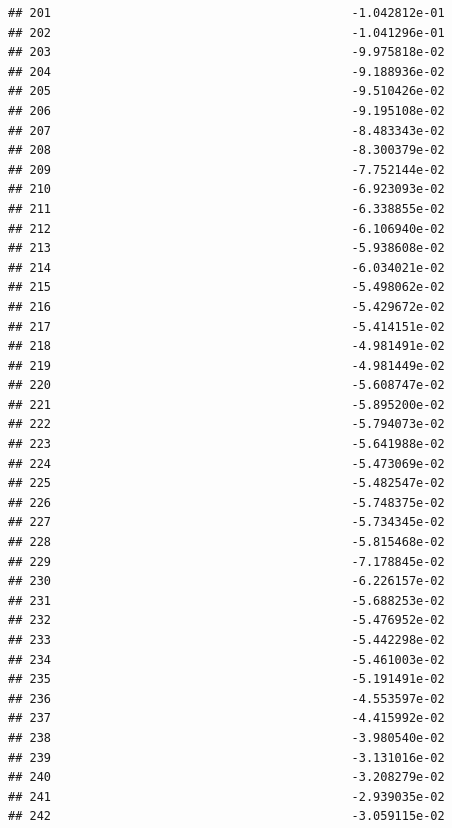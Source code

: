 \documentclass[
]{article}
\begin{document}
\begin{verbatim}
## 201                                          -1.042812e-01
## 202                                          -1.041296e-01
## 203                                          -9.975818e-02
## 204                                          -9.188936e-02
## 205                                          -9.510426e-02
## 206                                          -9.195108e-02
## 207                                          -8.483343e-02
## 208                                          -8.300379e-02
## 209                                          -7.752144e-02
## 210                                          -6.923093e-02
## 211                                          -6.338855e-02
## 212                                          -6.106940e-02
## 213                                          -5.938608e-02
## 214                                          -6.034021e-02
## 215                                          -5.498062e-02
## 216                                          -5.429672e-02
## 217                                          -5.414151e-02
## 218                                          -4.981491e-02
## 219                                          -4.981449e-02
## 220                                          -5.608747e-02
## 221                                          -5.895200e-02
## 222                                          -5.794073e-02
## 223                                          -5.641988e-02
## 224                                          -5.473069e-02
## 225                                          -5.482547e-02
## 226                                          -5.748375e-02
## 227                                          -5.734345e-02
## 228                                          -5.815468e-02
## 229                                          -7.178845e-02
## 230                                          -6.226157e-02
## 231                                          -5.688253e-02
## 232                                          -5.476952e-02
## 233                                          -5.442298e-02
## 234                                          -5.461003e-02
## 235                                          -5.191491e-02
## 236                                          -4.553597e-02
## 237                                          -4.415992e-02
## 238                                          -3.980540e-02
## 239                                          -3.131016e-02
## 240                                          -3.208279e-02
## 241                                          -2.939035e-02
## 242                                          -3.059115e-02

\end{verbatim}
\end{document}
